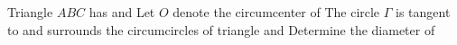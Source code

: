 Triangle $ABC$ has   and   Let $O$ denote the circumcenter of   The circle $\Gamma$ is tangent to and surrounds the circumcircles of triangle   and   Determine the diameter of 